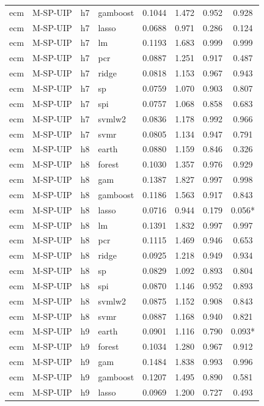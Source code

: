 \begin{ThreePartTable}
\begin{longtable}[t]{llclcccc}
ecm & M-SP-UIP & h7 & gamboost & 0.1044 & 1.472 & 0.952 & 0.928\\
ecm & M-SP-UIP & h7 & lasso & 0.0688 & 0.971 & 0.286 & 0.124\\
ecm & M-SP-UIP & h7 & lm & 0.1193 & 1.683 & 0.999 & 0.999\\
ecm & M-SP-UIP & h7 & pcr & 0.0887 & 1.251 & 0.917 & 0.487\\
ecm & M-SP-UIP & h7 & ridge & 0.0818 & 1.153 & 0.967 & 0.943\\
ecm & M-SP-UIP & h7 & sp & 0.0759 & 1.070 & 0.903 & 0.807\\
ecm & M-SP-UIP & h7 & spi & 0.0757 & 1.068 & 0.858 & 0.683\\
ecm & M-SP-UIP & h7 & svmlw2 & 0.0836 & 1.178 & 0.992 & 0.966\\
ecm & M-SP-UIP & h7 & svmr & 0.0805 & 1.134 & 0.947 & 0.791\\
\addlinespace
ecm & M-SP-UIP & h8 & earth & 0.0880 & 1.159 & 0.846 & 0.326\\
ecm & M-SP-UIP & h8 & forest & 0.1030 & 1.357 & 0.976 & 0.929\\
ecm & M-SP-UIP & h8 & gam & 0.1387 & 1.827 & 0.997 & 0.998\\
ecm & M-SP-UIP & h8 & gamboost & 0.1186 & 1.563 & 0.917 & 0.843\\
ecm & M-SP-UIP & h8 & lasso & 0.0716 & 0.944 & 0.179 & 0.056*\\
ecm & M-SP-UIP & h8 & lm & 0.1391 & 1.832 & 0.997 & 0.997\\
ecm & M-SP-UIP & h8 & pcr & 0.1115 & 1.469 & 0.946 & 0.653\\
ecm & M-SP-UIP & h8 & ridge & 0.0925 & 1.218 & 0.949 & 0.934\\
ecm & M-SP-UIP & h8 & sp & 0.0829 & 1.092 & 0.893 & 0.804\\
ecm & M-SP-UIP & h8 & spi & 0.0870 & 1.146 & 0.952 & 0.893\\
ecm & M-SP-UIP & h8 & svmlw2 & 0.0875 & 1.152 & 0.908 & 0.843\\
ecm & M-SP-UIP & h8 & svmr & 0.0887 & 1.168 & 0.940 & 0.821\\
\addlinespace
ecm & M-SP-UIP & h9 & earth & 0.0901 & 1.116 & 0.790 & 0.093*\\
ecm & M-SP-UIP & h9 & forest & 0.1034 & 1.280 & 0.967 & 0.912\\
ecm & M-SP-UIP & h9 & gam & 0.1484 & 1.838 & 0.993 & 0.996\\
ecm & M-SP-UIP & h9 & gamboost & 0.1207 & 1.495 & 0.890 & 0.581\\
ecm & M-SP-UIP & h9 & lasso & 0.0969 & 1.200 & 0.727 & 0.493\\

\end{longtable}
\end{ThreePartTable}
